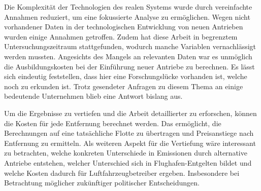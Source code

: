 Die Komplexität der Technologien des realen Systems wurde durch vereinfachte Annahmen reduziert, 
um eine fokussierte Analyse zu ermöglichen. 
Wegen nicht vorhandener Daten in der technologischen Entwicklung von neuen Antrieben wurden einige Annahmen getroffen.
Zudem hat diese Arbeit in begrenztem Untersuchungszeitraum stattgefunden, 
wodurch manche Variablen vernachlässigt werden mussten.
%
Angesichts des Mangels an relevanten Daten war es unmöglich die Ausbildungskosten bei der Einführung neuer Antriebe zu berechnen.
Es lässt sich eindeutig feststellen, dass hier eine Forschungslücke vorhanden ist, welche noch zu erkunden ist.
Trotz gesendeter Anfragen zu diesem Thema an einige bedeutende Unternehmen blieb eine Antwort bislang aus.
%

Um die Ergebnisse zu vertiefen und die Arbeit detaillierter zu erforschen, können die Kosten für jede Entfernung berechnet werden.
Das ermöglicht, die Berechnungen auf eine tatsächliche Flotte zu übertragen und Preisanstiege nach Entfernung zu ermitteln.
Als weiteren Aspekt für die Vertiefung wäre interessant zu betrachten, welche konkreten Unterschiede in Emissionen durch 
alternative Antriebe entstehen, welcher Unterschied sich in Flughafen-Entgelten bildet und welche Kosten dadurch
für Luftfahrzeugbetreiber ergeben. Insbesondere bei Betrachtung möglicher zukünftiger politischer Entscheidungen.


